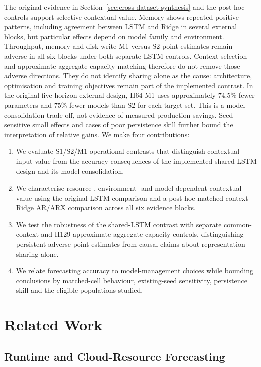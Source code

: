 \documentclass[a4paper,fleqn]{cas-dc}
\begin{document}
The original evidence in Section~\ref{sec:cross-dataset-synthesis} and the
post-hoc controls support selective contextual value. Memory shows repeated
positive patterns, including agreement between LSTM and Ridge in several
external blocks, but particular effects depend on model family and environment.
Throughput, memory and disk-write M1-versus-S2 point estimates remain adverse
in all six blocks under both separate LSTM controls. Context selection and
approximate aggregate capacity matching therefore do not remove those adverse
directions. They do not identify sharing alone as the cause: architecture,
optimisation and training objectives remain part of the implemented contrast.
In the original five-horizon external design, H64 M1 uses approximately
$74.5\%$ fewer parameters and $75\%$ fewer models than S2 for each target set.
This is a model-consolidation trade-off, not evidence of measured production
savings. Seed-sensitive small effects and cases of poor persistence skill
further bound the interpretation of relative gains. We make four contributions:

\begin{enumerate}
  \item We evaluate S1/S2/M1 operational contrasts that distinguish
    contextual-input value from the accuracy consequences of the implemented
    shared-LSTM design and its model consolidation.
  \item We characterise resource-, environment- and model-dependent contextual
    value using the original LSTM comparison and a post-hoc matched-context
    Ridge AR/ARX comparison across all six evidence blocks.
  \item We test the robustness of the shared-LSTM contrast with separate
    common-context and H129 approximate aggregate-capacity controls,
    distinguishing persistent adverse point estimates from causal claims
    about representation sharing alone.
  \item We relate forecasting accuracy to model-management choices while
    bounding conclusions by matched-cell behaviour, existing-seed sensitivity,
    persistence skill and the eligible populations studied.
\end{enumerate}

\section{Related Work}
\label{sec:related-work}

\subsection{Runtime and Cloud-Resource Forecasting}
\label{sec:rw-runtime}
\end{document}
